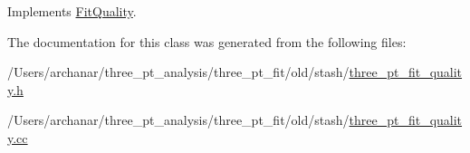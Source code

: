 Implements \mbox{\hyperlink{classFitQuality_a49a49e1206709d71c3ead41e981bb848}{Fit\+Quality}}.



The documentation for this class was generated from the following files\+:\begin{DoxyCompactItemize}
\item 
/\+Users/archanar/three\+\_\+pt\+\_\+analysis/three\+\_\+pt\+\_\+fit/old/stash/\mbox{\hyperlink{old_2stash_2three__pt__fit__quality_8h}{three\+\_\+pt\+\_\+fit\+\_\+quality.\+h}}\item 
/\+Users/archanar/three\+\_\+pt\+\_\+analysis/three\+\_\+pt\+\_\+fit/old/stash/\mbox{\hyperlink{old_2stash_2three__pt__fit__quality_8cc}{three\+\_\+pt\+\_\+fit\+\_\+quality.\+cc}}\end{DoxyCompactItemize}
